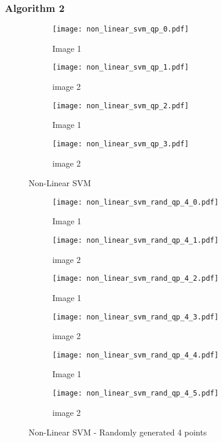 \documentclass[10pt, a4paper,reqno]{amsart}
\begin{document}
\subsubsection{Algorithm 2}


\begin{figure}[H]
	\centering	
	\begin{subfigure}{0.5\textwidth}
		\centering
		\texttt{[image: non\_linear\_svm\_qp\_0.pdf]}
		\caption{Image 1}
	\end{subfigure}%
	\begin{subfigure}{0.5\textwidth}
		\centering
		\texttt{[image: non\_linear\_svm\_qp\_1.pdf]}
		\caption{image 2}
	\end{subfigure}
	\begin{subfigure}{0.5\textwidth}
		\centering
		\texttt{[image: non\_linear\_svm\_qp\_2.pdf]}
		\caption{Image 1}
	\end{subfigure}%
	\begin{subfigure}{0.5\textwidth}
		\centering
		\texttt{[image: non\_linear\_svm\_qp\_3.pdf]}
		\caption{image 2}
	\end{subfigure}
	\caption{Non-Linear SVM}
\end{figure}

\begin{figure}[H]
	\centering	
	\begin{subfigure}{0.5\textwidth}
		\centering
		\texttt{[image: non\_linear\_svm\_rand\_qp\_4\_0.pdf]}
		\caption{Image 1}
	\end{subfigure}%
	\begin{subfigure}{0.5\textwidth}
		\centering
		\texttt{[image: non\_linear\_svm\_rand\_qp\_4\_1.pdf]}
		\caption{image 2}
	\end{subfigure}
	\begin{subfigure}{0.5\textwidth}
		\centering
		\texttt{[image: non\_linear\_svm\_rand\_qp\_4\_2.pdf]}
		\caption{Image 1}
	\end{subfigure}%
	\begin{subfigure}{0.5\textwidth}
		\centering
		\texttt{[image: non\_linear\_svm\_rand\_qp\_4\_3.pdf]}
		\caption{image 2}
	\end{subfigure}
	\begin{subfigure}{0.5\textwidth}
		\centering
		\texttt{[image: non\_linear\_svm\_rand\_qp\_4\_4.pdf]}
		\caption{Image 1}
	\end{subfigure}%
	\begin{subfigure}{0.5\textwidth}
		\centering
		\texttt{[image: non\_linear\_svm\_rand\_qp\_4\_5.pdf]}
		\caption{image 2}
	\end{subfigure}
	\caption{Non-Linear SVM - Randomly generated 4 points}
\end{figure}
\end{document}
